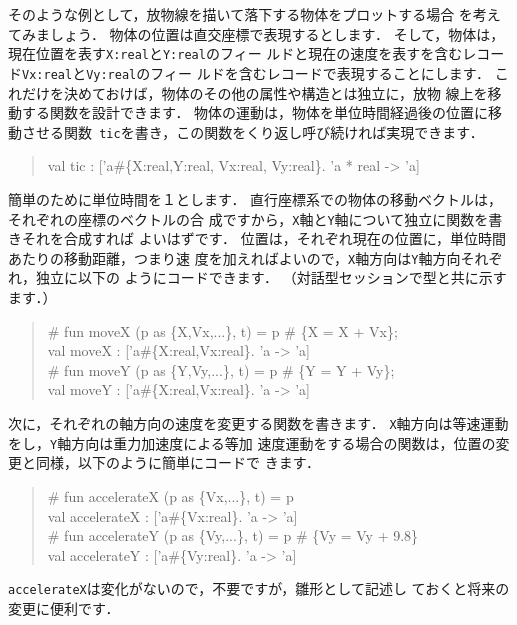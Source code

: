 \documentclass{jbook}
\begin{document}
	そのような例として，放物線を描いて落下する物体をプロットする場合
を考えてみましょう． 
	物体の位置は直交座標で表現するとします．
	そして，物体は，現在位置を表す{\tt X:real}と{\tt Y:real}のフィー
ルドと現在の速度を表すを含むレコード{\tt Vx:real}と{\tt Vy:real}のフィー
ルドを含むレコードで表現することにします．
	これだけを決めておけば，物体のその他の属性や構造とは独立に，放物
線上を移動する関数を設計できます．
	物体の運動は，物体を単位時間経過後の位置に移動させる関数{\tt
tic}を書き，この関数をくり返し呼び続ければ実現できます．
\begin{tt}\begin{quote}
val tic : ['a\#\{X:real,Y:real, Vx:real, Vy:real\}. 'a * real -> 'a]
\end{quote}\end{tt}
	簡単のために単位時間を１とします．
	直行座標系での物体の移動ベクトルは，それぞれの座標のベクトルの合
成ですから，{\tt X}軸と{\tt Y}軸について独立に関数を書きそれを合成すれば
よいはずです．
	位置は，それぞれ現在の位置に，単位時間あたりの移動距離，つまり速
度を加えればよいので，{\tt X}軸方向は{\tt Y}軸方向それぞれ，独立に以下の
ようにコードできます．
	（対話型セッションで型と共に示すます．）
\begin{tt}\begin{quote}
\# fun moveX (p as \{X,Vx,...\}, t) = p \# \{X = X + Vx\};\\
val moveX : ['a\#\{X:real,Vx:real\}. 'a -> 'a]\\
\# fun moveY (p as \{Y,Vy,...\}, t) = p \# \{Y = Y + Vy\};\\
val moveY : ['a\#\{X:real,Vx:real\}. 'a -> 'a]
\end{quote}\end{tt}
	次に，それぞれの軸方向の速度を変更する関数を書きます．
	{\tt X}軸方向は等速運動をし，{\tt Y}軸方向は重力加速度による等加
速度運動をする場合の関数は，位置の変更と同様，以下のように簡単にコードで
きます．
\begin{tt}\begin{quote}
\# fun accelerateX (p as \{Vx,...\}, t) = p\\
val accelerateX : ['a\#\{Vx:real\}. 'a -> 'a]\\
\# fun accelerateY (p as \{Vy,...\}, t) = p \# \{Vy = Vy + 9.8\}\\
val accelerateY : ['a\#\{Vy:real\}. 'a -> 'a]\\
\end{quote}\end{tt}
	{\tt accelerateX}は変化がないので，不要ですが，雛形として記述し
ておくと将来の変更に便利です．
	
\end{document}
